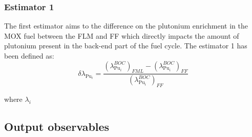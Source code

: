 \subsubsection{Estimator 1}
The first estimator aims to the difference on the plutonium enrichment in the MOX
fuel between the \gls{FLM} and \gls{FF} which directly impacts the amount of
plutonium present in the back-end part of the fuel cycle. The estimator 1 has
been defined as:
\begin{equation}
    \delta{\lambda_{\mathrm{Pu}_{i}}} =
        \frac{\left(\lambda_{\mathrm{Pu}_i}^{BOC}\right)_{FML} 
              - \left(\lambda_{\mathrm{Pu}_i}^{BOC}\right)_{FF}}
             {\left(\lambda_{\mathrm{Pu}_i}^{BOC}\right)_{FF}}
\end{equation}

where $\lambda_i$

\subsection{Output observables}



